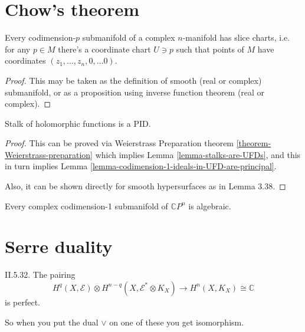 \section{Chow's theorem}
\label{section-chow-theorem}

\begin{proposition}
\label{proposition-slice-charts}
Every codimension-$p$ submanifold of a complex $n$-manifold has slice charts,
i.e. for any $p \in M$ there's a coordinate chart $U \ni p$ such that points of
$M$ have coordinates $(z_1,\ldots,z_n,0,\ldots 0)$.
\end{proposition}

\begin{proof}
This may be taken as the definition of smooth (real or complex) submanifold, or
as a proposition using inverse function theorem (real or complex).
\end{proof}

\begin{proposition}
\label{proposition-stalk-is-PID}
Stalk of holomorphic functions is a PID.
\end{proposition}

\begin{proof}
This can be proved via Weierstrass Preparation theorem
\ref{theorem-Weierstrass-preparation} which implies
 Lemma \ref{lemma-stalks-are-UFDs}, and this in turn implies Lemma 
\ref{lemma-codimension-1-ideals-in-UFD-are-principal}.

Also, it can be shown directly for smooth hypersurfaces
 as in \cite{lec} Lemma 3.38.
\end{proof}

\begin{theorem}
\label{theorem-Chow-for-hypersurfaces}
Every complex codimension-1 submanifold of $\mathbb{C}P^{n}$ is algebraic.
\end{theorem}

\section{Serre duality}
\label{section-serre-duality}

\begin{theorem}
\label{theorem-serre-duality}
\cite{voi} II.5.32. The pairing
$$
H^q(X,\mathcal{E})\otimes
H^{n-q}(X,\mathcal{E}^*\otimes K_X)\to H^{n}(X,K_X)\cong\mathbb{C}
$$
is perfect.
\end{theorem}

So when you put the dual \(\vee\) on one of these you get isomorphism.

